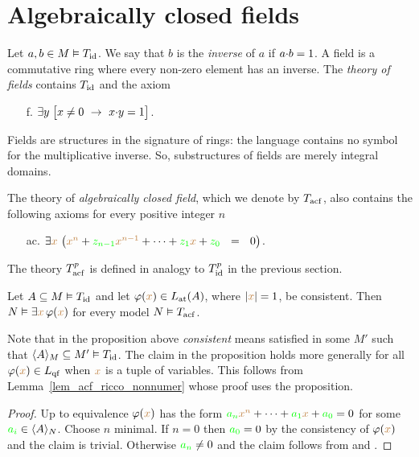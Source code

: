 \section{Algebraically closed fields}

Let $a,b\in M\models T_{\rm id}$.
%
We say that $b$ is the \emph{inverse\/} of $a$ if $a\mdot b=1$.
%
A field is a commutative ring where every non-zero element has an inverse.
%
The \emph{theory of fields\/} contains $T_{\rm id}$ and the axiom
\begin{itemize}
\item[f.]$\E  y\; \big[x\neq0\ \imp\ x\mdot y =1\big]$.
\end{itemize}
Fields are structures in the signature of rings: the language contains no symbol for the multiplicative inverse.
%
So, substructures of fields are merely integral domains.

The theory of \emph{algebraically closed field}, which we denote by \emph{$T_{\rm acf}$}, also contains the following axioms for every positive integer $n$

\begin{itemize}
\item[ac.] $\E {\mr x}\ \big( {\mr x^{n}} + {\gr z_{n-1}} {\mr x^{n-1}} + \dots + {\gr z_1}  {\mr x} + {\gr z_0}\ \ =\ \ 0\big)$.
\end{itemize}

The theory \emph{$T^p_{\rm acf}$} is defined in analogy to $T^p_{\rm id}$ in the previous section.

\begin{proposition}\label{prop_acf_cons_sodd}
Let $A\subseteq M\models T_{\rm id}$ and let $\phi({\mr x})\in L_{\rm at}(A)$, where $|{\mr x}|=1$, be consistent.
%
Then $N\models\E {\mr x} \,\phi({\mr x})$ for every model $N\models T_{\rm acf}$.
\end{proposition}

Note that in the proposition above \textit{consistent\/} means satisfied in some $M'$ such that $\<A\>_M\subseteq M'\models T_{\rm id}$.
%
The claim in the proposition holds more generally for all $\phi({\mr x})\in L_{\rm qf}$ when ${\mr x}$ is a tuple of variables.
%
This follows from Lemma~\ref{lem_acf_ricco_nonnumer} whose proof uses the proposition.

\begin{proof}
Up to equivalence $\phi({\mr x})$ has the form ${\gr a_n}{\mr x^n} + \dots + {\gr a_1} {\mr x} + {\gr a_0}=0$ for some ${\gr a_i}\in\<A\>_N$.
%
Choose $n$ minimal.
%
If $n=0$ then ${\gr a_0}=0$ by the consistency of $\phi({\mr x})$ and the claim is trivial.
%
Otherwise ${\gr a_n}\neq0$ and the claim follows from  and .
\end{proof}

